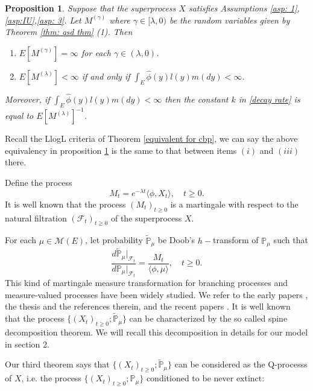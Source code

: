 \documentclass[12pt,a4paper]{amsart}
\theoremstyle{plain}
\newtheorem{prop}[thm]{Proposition}
\theoremstyle{definition}
\numberwithin{equation}{section}
\begin{document}
\begin{prop}\label{exp prop}
	Suppose that the superprocess $X$ satisfies Assumptions \ref{asp: 1},\ref{asp:IU},\ref{asp: 3}.
	Let $M^{(\gamma)}$ where $\gamma \in [\lambda,0)$ be the random variables given by Theorem \ref{thm: qsd thm} (1). Then
\begin{enumerate}
\item
	$E[M^{(\gamma)}] = \infty$ for each $\gamma \in (\lambda, 0)$.
\item
	$E[M^{(\lambda)}] < \infty$ if and only if $\int_E \hat\phi(y)l(y)m(dy)<\infty$.
\end{enumerate}
	Moreover, if $\int_E \hat\phi(y)l(y)m(dy)<\infty$ then the constant $k$ in \eqref{decay rate} is equal to $E[M^{(\lambda)}]^{-1}$.
\end{prop}
	Recall the LlogL criteria of Theorem \ref{equivalent for cbp}, we can say the above equivalency in proposition \ref{exp prop} is the same to that between items $(i)$ and $(iii)$ there.

	Define the process
\[
	M_t=e^{-\lambda t}  \langle \phi, X_t\rangle, \quad t\geq 0.
\]
	It is well known that the process  $(M_t)_{t\geq 0}$ is a martingale with respect to the natural filtration $(\mathscr F_t)_{t\geq 0}$ of the superprocess $X$.

	For each $\mu \in \mathcal M(E)$, let probability $\widetilde{\mathbb P}_\mu$ be Doob's $h-$transform of $\mathbb P_\mu$ such that
\begin{equation} \label{eq: martingale transformation}
	\frac{d\widetilde{\mathbb P}_\mu|_{\mathscr F_t}}{d\mathbb P_\mu|_{\mathscr F_t}}
	=\frac{M_t}{\langle\phi,\mu\rangle },
	\quad t\geq 0.
\end{equation}
	This kind of martingale measure transformation for branching processes and measure-valued processes have been widely studied.
	We refer to the early papers \cite{EnglanderKyprianou2004Local,Evans1993Two,RoellyRouault1989Processus}, the thesis \cite{Penisson2010Conditional} and the references therein, and the recent papers \cite{ChampagnatRoelly2008Limit,RenSongSun2017Spine,RenSongZhang2018Williams}.
	It is well known that the process $\{(X_t)_{t\geq 0}; \widetilde{\mathbb P}_{\mu}\}$ can be characterized by the so called spine decomposition theorem.
	We will recall this decomposition in details for our model in section $2$.

	Our third theorem says that $\{(X_t)_{t\geq 0}; \widetilde{\mathbb P}_{\mu}\}$ can be considered as the Q-processs of $X$, i.e. the process $\{(X_t)_{t\geq 0}; \mathbb P_{\mu}\}$ conditioned to be never extinct:
\end{document}
